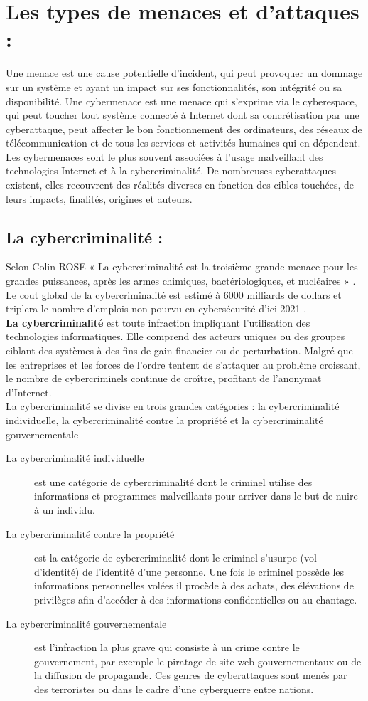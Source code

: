 \section{Les types de menaces et d’attaques : }
Une menace est une cause potentielle d’incident, qui peut provoquer un dommage sur un système et ayant un impact sur ses fonctionnalités, son intégrité ou sa disponibilité. Une cybermenace est une menace qui s’exprime via le cyberespace, qui peut toucher tout système connecté à Internet dont sa concrétisation par une cyberattaque, peut affecter le bon fonctionnement des ordinateurs, des réseaux de télécommunication et de tous les services et activités humaines qui en dépendent. Les cybermenaces sont le plus souvent associées à l’usage malveillant des technologies Internet et à la cybercriminalité. De nombreuses cyberattaques existent, elles recouvrent des réalités diverses en fonction des cibles touchées, de leurs impacts, finalités, origines et auteurs.
\subsection{La cybercriminalité : }
Selon Colin ROSE « La cybercriminalité est la troisième grande menace pour les grandes puissances, après les armes chimiques, bactériologiques, et nucléaires » \cite{ref10}. Le cout global de la cybercriminalité est estimé à 6000 milliards de dollars et triplera le nombre d’emplois non pourvu en cybersécurité d’ici 2021 \cite{ref1112}.\\
\textbf{La cybercriminalité} est toute infraction impliquant l’utilisation des technologies informatiques. Elle comprend des acteurs uniques ou des groupes ciblant des systèmes à des fins de gain financier ou de perturbation. Malgré que les entreprises et les forces de l’ordre tentent de s’attaquer au problème croissant, le nombre de cybercriminels continue de croître, profitant de l’anonymat d’Internet.\\
La cybercriminalité se divise en trois grandes catégories : la cybercriminalité individuelle, la cybercriminalité contre la propriété et la cybercriminalité gouvernementale \cite{ref1112}
\begin{description}
\item[La cybercriminalité individuelle] est une catégorie de cybercriminalité dont le criminel utilise des informations et programmes malveillants pour arriver dans le but de nuire à un individu.
\item[La cybercriminalité contre la propriété] est la catégorie de cybercriminalité dont le criminel s’usurpe (vol d’identité) de l’identité d’une personne. Une fois le criminel possède les informations personnelles volées il procède à des achats, des élévations de privilèges afin d’accéder à des informations confidentielles ou au chantage.
\item[La cybercriminalité gouvernementale] est l’infraction la plus grave qui consiste à un crime contre le gouvernement, par exemple le piratage de site web gouvernementaux ou de la diffusion de propagande. Ces genres de cyberattaques sont menés par des terroristes ou dans le cadre d’une cyberguerre entre nations.
\end{description}


